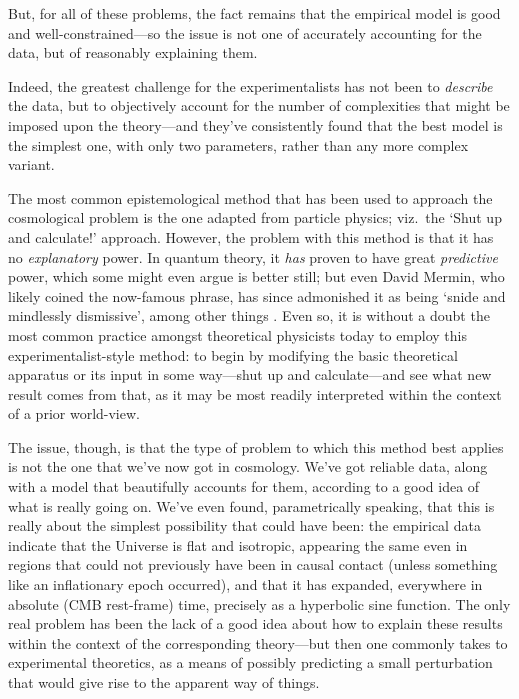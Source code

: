 But, for all of these problems, the fact remains that the empirical model is good and well-constrained---so the issue is not one of accurately accounting for the data, but of reasonably explaining them.

Indeed, the greatest challenge for the experimentalists has not been to \textit{describe} the data, but to objectively account for the number of complexities that might be imposed upon the theory---and they've consistently found that the best model is the simplest one, with only two parameters, rather than any more complex variant.

The most common epistemological method that has been used to approach the cosmological problem is the one adapted from particle physics; viz.\ the `Shut up and calculate!' approach. However, the problem with this method is that it has no \textit{explanatory} power. In quantum theory, it \textit{has} proven to have great \textit{predictive} power, which some might even argue is better still; but even David Mermin, who likely coined the now-famous phrase, has since admonished it as being `snide and mindlessly dismissive', among other things \cite{Mermin2004}. Even so, it is without a doubt the most common practice amongst theoretical physicists today to employ this experimentalist-style method: to begin by modifying the basic theoretical apparatus or its input in some way---shut up and calculate---and see what new result comes from that, as it may be most readily interpreted within the context of a prior world-view.

The issue, though, is that the type of problem to which this method best applies is not the one that we've now got in cosmology. We've got reliable data, along with a model that beautifully accounts for them, according to a good idea of what is really going on. We've even found, parametrically speaking, that this is really about the simplest possibility that could have been: the empirical data indicate that the Universe is flat and isotropic, appearing the same even in regions that could not previously have been in causal contact (unless something like an inflationary epoch occurred), and that it has expanded, everywhere in absolute (CMB rest-frame) time, precisely as a hyperbolic sine function. The only real problem has been the lack of a good idea about how to explain these results within the context of the corresponding theory---but then one commonly takes to experimental theoretics, as a means of possibly predicting a small perturbation that would give rise to the apparent way of things.

